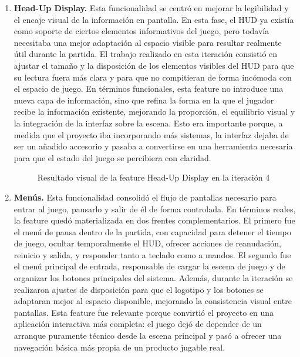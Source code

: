\begin{enumerate}
\item \textbf{Head-Up Display.} Esta funcionalidad se centró en mejorar la legibilidad y el
encaje visual de la información en pantalla. En esta fase, el HUD ya existía como soporte
de ciertos elementos informativos del juego, pero todavía necesitaba una mejor adaptación al
espacio visible para resultar realmente útil durante la partida. El trabajo realizado en
esta iteración consistió en ajustar el tamaño y la disposición de los elementos visibles del
HUD para que su lectura fuera más clara y para que no compitieran de forma incómoda con el
espacio de juego. En términos funcionales, esta feature no introduce una nueva capa de
información, sino que refina la forma en la que el jugador recibe la información existente,
mejorando la proporción, el equilibrio visual y la integración de la interfaz sobre la
escena. Esto era importante porque, a medida que el proyecto iba incorporando más sistemas,
la interfaz dejaba de ser un añadido accesorio y pasaba a convertirse en una herramienta
necesaria para que el estado del juego se percibiera con claridad.

\begin{figure}[H]
\begin{center}
\caption{Resultado visual de la feature Head-Up Display en la iteración 4}
\label{fig:iteracion4-feature-hud}
\end{center}
\end{figure}

\item \textbf{Menús.} Esta funcionalidad consolidó el flujo de pantallas necesario para
entrar al juego, pausarlo y salir de él de forma controlada. En términos reales, la feature
quedó materializada en dos frentes complementarios. El primero fue el menú de pausa dentro
de la partida, con capacidad para detener el tiempo de juego, ocultar temporalmente el HUD,
ofrecer acciones de reanudación, reinicio y salida, y responder tanto a teclado como a
mandos. El segundo fue el menú principal de entrada, responsable de cargar la escena de
juego y de organizar los botones principales del sistema. Además, durante la iteración se
realizaron ajustes de disposición para que el logotipo y los botones se adaptaran mejor al
espacio disponible, mejorando la consistencia visual entre pantallas. Esta feature fue
relevante porque convirtió el proyecto en una aplicación interactiva más completa: el juego
dejó de depender de un arranque puramente técnico desde la escena principal y pasó a ofrecer
una navegación básica más propia de un producto jugable real.


\end{enumerate}
